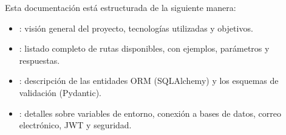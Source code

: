 \documentclass[letterpaper,10pt,spanish]{sphinxmanual}
\begin{document}
\sphinxAtStartPar
Esta documentación está estructurada de la siguiente manera:
\begin{itemize}
\item {} 
\sphinxAtStartPar
{}: visión general del proyecto, tecnologías utilizadas y objetivos.

\item {} 
\sphinxAtStartPar
{}: listado completo de rutas disponibles, con ejemplos, parámetros y respuestas.

\item {} 
\sphinxAtStartPar
{}: descripción de las entidades ORM (SQLAlchemy) y los esquemas de validación (Pydantic).

\item {} 
\sphinxAtStartPar
{}: detalles sobre variables de entorno, conexión a bases de datos, correo electrónico, JWT y seguridad.

\end{itemize}
\end{document}
